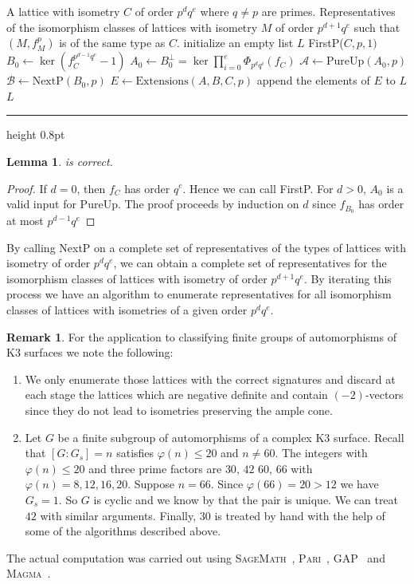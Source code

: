 \documentclass[a4paper]{amsart}
\makeatletter
\theoremstyle{definition}
\newtheorem{remark}[definition]{Remark}
\theoremstyle{plain}
\newtheorem{lemma}[definition]{Lemma}
\newcommand{\B}{\mathcal{B}}
\newcommand{\A}{\mathcal{A}}
\def\hrulefill{\leavevmode\leaders\hrule height 0.8pt\hfill\kern\z@}
\makeatother
\begin{document}
\begingroup
{}\label{NextP}
\endgroup
\begin{algorithmic}[1]
\REQUIRE A lattice with isometry $C$ of order $p^dq^e$ where $q \neq p$ are primes.
\ENSURE Representatives of the isomorphism classes of lattices with isometry $M$ of order $p^{d+1}q^e$ such that $(M,f_M^p)$ is of the same type as $C$.
\STATE initialize an empty list $L$
    \RETURN FirstP($C,p,1)$
\ENDIF
\STATE $B_0 \gets \ker( f_C^{p^{d-1}q^e}-1)$
\STATE $A_0 \gets B_0^\perp = \ker \prod_{i=0}^e \Phi_{p^dq^i}(f_C)$
\STATE $\A \gets \mbox{PureUp}(A_0, p)$
\STATE $\B \gets \mbox{NextP}(B_0, p)$
\FOR{$(A,B) \in \A \times \B$}
    \STATE $E \gets \mbox{Extensions}(A,B,C,p)$
    \STATE append the elements of $E$ to $L$
\ENDFOR
\RETURN $L$
\end{algorithmic}\hrulefill\\
\begin{lemma}
 is correct.
\end{lemma}
\begin{proof}
 If $d=0$, then $f_C$ has order $q^e$. Hence we can call FirstP. For $d>0$, $A_0$ is a valid input for PureUp.
The proof proceeds by induction on $d$ since $f_{B_0}$ has order at most $p^{d-1}q^e$
\end{proof}

By calling NextP on a complete set of representatives of the types of lattices with isometry of order $p^dq^e$, we can obtain a complete set of representatives for the isomorphism classes of lattices with isometry of order $p^{d+1}q^e$.
By iterating this process we have an algorithm to enumerate representatives for all isomorphism classes of lattices with isometries of a given order $p^d q^e$.

\begin{remark}\label{rem:latticeK3}
  For the application to classifying finite groups of automorphisms of K3 surfaces we note the following:
  \begin{enumerate}
    \item
     We only enumerate those lattices with the correct signatures and discard at each stage the lattices which are negative definite and contain $(-2)$-vectors since they do not lead to isometries preserving the ample cone.
    \item
Let $G$ be a finite subgroup of automorphisms of a complex K3 surface.
Recall that $[G:G_s]=n$ satisfies $\varphi(n) \leq 20$ and $n \neq 60$.
The integers with $\varphi(n) \leq 20$ and three prime factors are
$30$, $42$ $60$, $66$ with $\varphi(n) = 8 , 12 , 16, 20$.
      Suppose $n = 66$. Since $\varphi(66)=20>12$ we have $G_s=1$. So $G$ is cyclic and we know by \cite{keum2015} that the pair is unique. We can treat $42$ with similar arguments. Finally, $30$ is treated by hand with the help of some of the algorithms described above.
  \end{enumerate}

  The actual computation was carried out using \textsc{SageMath}~\cite{sagemath}, \textsc{Pari}~\cite{PARI}, \textsc{GAP}~\cite{GAP4} and \textsc{Magma}~\cite{magma}.
\end{remark}
\end{document}
